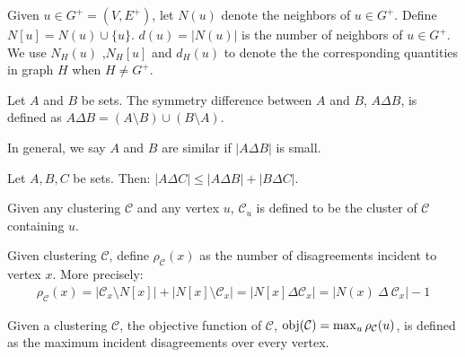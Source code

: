 \begin{definition}
Given $u \in G^{+} = (V,E^{+})$, let $N(u)$ denote the neighbors of $u \in G^{+}$. Define $N[u] = N(u) \cup \{u\}$. $d(u) = |N(u)|$ is the number of neighbors of $u \in G^+$. We use $N_{H}(u)$ ,$N_{H}[u]$ and $d_{H}(u)$ to denote the the corresponding quantities in graph $H$ when $H \neq G^{+}$.
\end{definition}

\begin{definition}
Let $A$ and $B$ be sets. The symmetry difference between $A$ and $B$, $A \Delta B$, is defined as $A \Delta B = (A \setminus B) \cup (B \setminus A)$.
\end{definition}
In general, we say $A$ and $B$ are similar if $|A \Delta B|$ is small.
\begin{lemma}
\label{lem:triangleineq}
Let $A, B, C$ be sets. Then: $|A \Delta C| \le |A \Delta B| + |B \Delta C|$.
\end{lemma}


\begin{definition}
Given any clustering $\mathcal{C}$ and any vertex $u$, $\mathcal{C}_u$ is defined to be the cluster of $\mathcal{C}$ containing $u$. 
\end{definition}

\begin{definition}
Given clustering $\mathcal{C}$, define $\rho_{\mathcal{C}}(x)$ as the number of disagreements incident to vertex $x$. More precisely:
\begin{align*}
    \rho_{\mathcal{C}}(x) = |\mathcal{C}_x \setminus N[x]| + |N[x] \setminus \mathcal{C}_x| = |N[x] \Delta \mathcal{C}_x| = |N(x)~\Delta~\mathcal{C}_x| - 1
\end{align*}
\end{definition}


\begin{definition}
Given a clustering $\mathcal{C}$, the objective function of $\mathcal{C}$, $\mathrm{obj}(\mathcal{C}) = \max_{u} \rho_{\mathcal{C}}(u)$, is defined as the maximum incident disagreements over every vertex. 
\end{definition}



